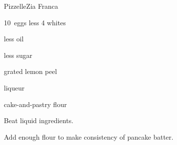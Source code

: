 \begin{recipe}{Pizzelle\FIXME}{Zia Franca}{}

\begin{ingredients}
\item 10~eggs less 4 whites
\item {} less  oil
\item {} less  sugar
\item grated lemon peel
\item {} liqueur
\item cake-and-pastry flour
\end{ingredients}

\begin{directions}
\item Beat liquid ingredients.
\item Add enough flour to make consistency of pancake batter.
\end{directions}

\end{recipe}
